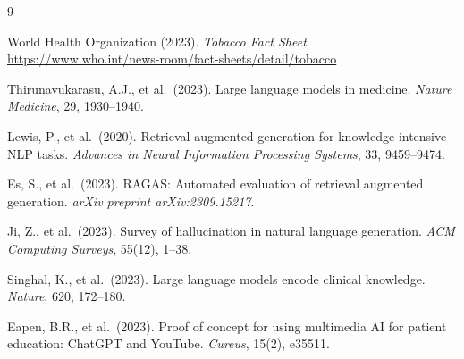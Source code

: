 \documentclass[11pt,a4paper]{article}
\begin{document}
\begin{thebibliography}{9}

World Health Organization (2023).
\textit{Tobacco Fact Sheet}.
\url{https://www.who.int/news-room/fact-sheets/detail/tobacco}

Thirunavukarasu, A.J., et al.\ (2023).
Large language models in medicine.
\textit{Nature Medicine}, 29, 1930--1940.

Lewis, P., et al.\ (2020).
Retrieval-augmented generation for knowledge-intensive NLP tasks.
\textit{Advances in Neural Information Processing Systems}, 33, 9459--9474.

Es, S., et al.\ (2023).
RAGAS: Automated evaluation of retrieval augmented generation.
\textit{arXiv preprint arXiv:2309.15217}.

Ji, Z., et al.\ (2023).
Survey of hallucination in natural language generation.
\textit{ACM Computing Surveys}, 55(12), 1--38.

Singhal, K., et al.\ (2023).
Large language models encode clinical knowledge.
\textit{Nature}, 620, 172--180.

Eapen, B.R., et al.\ (2023).
Proof of concept for using multimedia AI for patient education: ChatGPT and
YouTube.
\textit{Cureus}, 15(2), e35511.

\end{thebibliography}
\end{document}
